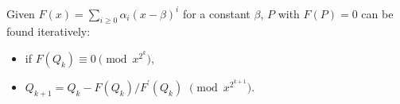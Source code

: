 \newsavebox{\newtontab}
\noindent
\begin{minipage}[t]{\dimexpr\linewidth-\wd\newtontab-0.8em}
Given $F(x) = \sum_{i \ge 0} \alpha_i (x - \beta)^i$ for a constant $\beta$, $P$ with $F(P) = 0$ can be found iteratively:
\begin{itemize}
  \item if $F(Q_k) \equiv 0 \pmod {x^{2^k}}$,
  \item $Q_{k+1} = Q_k - F(Q_k) / F^\prime(Q_k)$ $\pmod {x^{2^{k+1}}}$.
\end{itemize}
\end{minipage}\hfill
\usebox{\newtontab}
